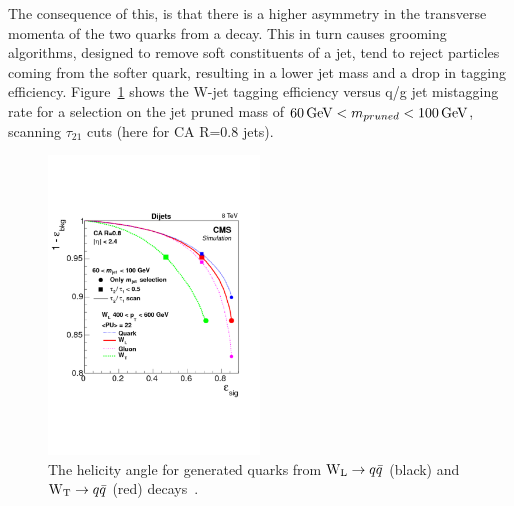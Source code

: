 The consequence of this, is that there is a higher asymmetry in the transverse momenta of the two quarks from a \PWT decay. This in turn causes grooming algorithms, designed to remove soft constituents of a jet, tend to reject particles coming from the softer quark, resulting in a lower jet mass and a drop in tagging efficiency. Figure~\ref{fig:objreco:wtwleff} shows the W-jet tagging efficiency versus q/g jet mistagging rate for a selection on the jet pruned mass of $60 \,\text{Ge\hspace{-.08em}V} < m_{pruned} < 100 \,\text{Ge\hspace{-.08em}V}$, scanning $\tau_{21}$ cuts (here for CA R=0.8 jets).

\begin{figure}[h!] 
    \centering 
    \includegraphics[width=0.5\textwidth]{figures/event_reconstruction/substructure_pas_roc3b.pdf}
     \caption{The helicity angle for generated quarks from $\mathrm{W}_{\mathrm{L}}\rightarrow q\bar{q}$ (black) and $\mathrm{W}_{\mathrm{T}}\rightarrow q\bar{q}$ (red) decays~\cite{Khachatryan:2014vla}.}
     \label{fig:objreco:wtwleff}
 \end{figure}

